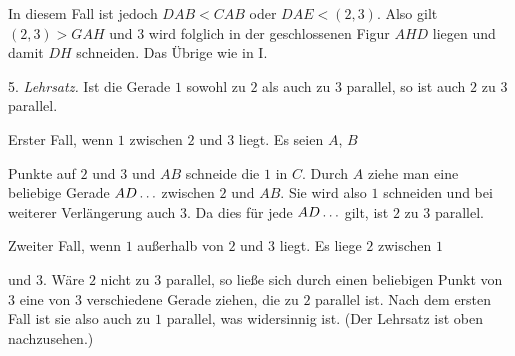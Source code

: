 In diesem Fall ist jedoch $DAB < CAB$ oder $DAE < (2,3)$. Also gilt $(2,3) > GAH$ und $3$ wird folglich in der geschlossenen Figur $AHD$ liegen und damit $DH$ schneiden. Das Übrige wie in I.

5. \emph{Lehrsatz.} Ist die Gerade $1$ sowohl zu $2$ als auch zu $3$ parallel, so ist auch $2$ zu $3$ parallel.

 Erster Fall, wenn $1$ zwischen $2$ und $3$ liegt. Es seien $A$, $B$

\begin{center}

\end{center}
\noindent Punkte auf $2$ und $3$ und $AB$ schneide die $1$ in $C$. Durch $A$ ziehe man eine beliebige Gerade $AD\mathinner{.\,.\,.}$ zwischen $2$ und $AB$. Sie wird also $1$ schneiden und bei weiterer Verlängerung auch $3$. Da dies für jede $AD\mathinner{.\,.\,.}$ gilt, ist $2$ zu $3$ parallel.

Zweiter Fall, wenn $1$ außerhalb von $2$ und $3$ liegt. Es liege $2$ zwischen $1$

\begin{center}

\end{center}
\noindent und $3$. Wäre $2$ nicht zu $3$ parallel, so ließe sich durch einen beliebigen Punkt von $3$ eine von $3$ verschiedene Gerade ziehen, die zu $2$ parallel ist. Nach dem ersten Fall ist sie also auch zu $1$ parallel, was widersinnig ist. (Der Lehrsatz ist oben nachzusehen.)

